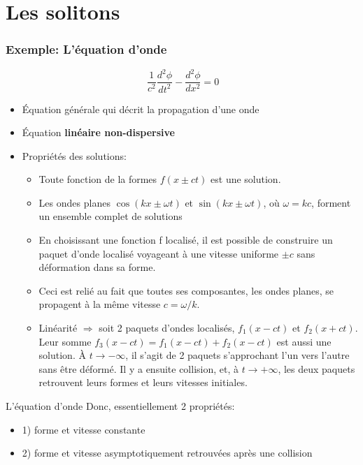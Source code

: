 \documentclass{beamer}
\begin{document}
\section{Les solitons}





\begin{frame}
\frametitle{Exemple: L'équation d'onde}
\begin{equation*}
\ \frac{1}{c^{2}} \dfrac{d^{2}\phi}{dt^{2}} - \dfrac{d^{2}\phi}{dx^{2}} = 0
\end{equation*}
\begin{itemize}
\item<1-> Équation générale qui décrit la propagation d'une onde
\item<1-> Équation \textbf{linéaire non-dispersive}
\end{itemize}
\end{frame}

\begin{frame}
\begin{itemize}
\item Propriétés des solutions:
      \begin{itemize}
      \item Toute fonction de la formes $f(x\pm ct)$ est une solution.
      \item Les ondes planes $\cos(kx\pm\omega t)$ et $\sin(kx\pm\omega t)$, où $\omega=kc$, forment un ensemble complet de solutions
      \item En choisissant une fonction f localisé, il est possible de construire un paquet d'onde localisé voyageant à une vitesse uniforme $\pm c$ sans déformation dans sa forme.
      \item Ceci est relié au fait que toutes ses composantes, les ondes planes, se propagent à la même vitesse $c=\omega/k$.
      \item Linéarité $\Rightarrow$ soit 2 paquets d'ondes localisés, $f_{1}(x-ct)$ et $f_{2}(x+ct)$. Leur somme $f_{3}(x-ct) = f_{1}(x-ct) + f_{2}(x-ct)$ est aussi une solution. À $t\rightarrow-\infty$, il s'agit de 2 paquets s'approchant l'un vers l'autre sans être déformé. Il y a ensuite collision, et, à $t\rightarrow+\infty$, les deux paquets retrouvent leurs formes et leurs vitesses initiales.
      \end{itemize}
\end{itemize}
\end{frame}



\begin{frame}
\begin{block}{L'équation d'onde}
Donc, essentiellement 2 propriétés:
\begin{itemize}
\item <2-> 1) forme et vitesse constante
\item <2-> 2) forme et vitesse asymptotiquement retrouvées après une collision
\end{itemize}
\end{block}
\end{frame}
\end{document}
